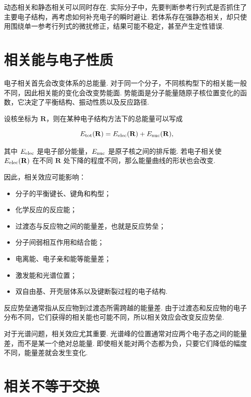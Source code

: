 \documentclass[UTF8,11pt,a4paper,openany]{ctexbook}
\begin{document}
动态相关和静态相关可以同时存在. 实际分子中，先要判断参考行列式是否抓住了主要电子结构，再考虑如何补充电子的瞬时避让. 若体系存在强静态相关，却只使用围绕单一参考行列式的微扰修正，结果可能不稳定，甚至产生定性错误. 

\section{相关能与电子性质}

电子相关首先会改变体系的总能量. 对于同一个分子，不同核构型下的相关能一般不同，因此相关能的变化会改变势能面. 势能面是分子能量随原子核位置变化的函数，它决定了平衡结构、振动性质以及反应路径. 

设核坐标为 $\mathbf{R}$，则在某种电子结构方法下的总能量可以写成

\[
E_{\rm tot}(\mathbf{R})
=
E_{\rm elec}(\mathbf{R})
+
E_{\rm nuc}(\mathbf{R}),
\]

其中 $E_{\rm elec}$ 是电子部分能量，$E_{\rm nuc}$ 是原子核之间的排斥能. 若电子相关使 $E_{\rm elec}(\mathbf{R})$ 在不同 $\mathbf{R}$ 处下降的程度不同，那么能量曲线的形状也会改变. 

因此，相关效应可能影响：

\begin{itemize}
\item 分子的平衡键长、键角和构型；
\item 化学反应的反应能；
\item 过渡态与反应物之间的能量差，也就是反应势垒；
\item 分子间弱相互作用和结合能；
\item 电离能、电子亲和能等能量差；
\item 激发能和光谱位置；
\item 双自由基、开壳层体系以及键断裂过程的电子结构. 
\end{itemize}

\begin{definitionbox}
反应势垒通常指从反应物到过渡态所需跨越的能量差. 由于过渡态和反应物的电子分布不同，它们获得的相关能也可能不同，所以相关效应会改变反应势垒. 
\end{definitionbox}

对于光谱问题，相关效应尤其重要. 光谱峰的位置通常对应两个电子态之间的能量差，而不是某一个绝对总能量. 即使相关能对两个态都为负，只要它们降低的幅度不同，能量差就会发生变化. 

\section{相关不等于交换}
\end{document}
